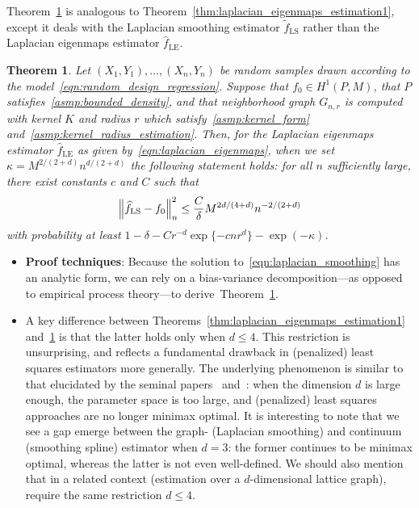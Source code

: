 \documentclass{article}
\newcommand{\1}{\mathbf{1}}
\newcommand{\wt}[1]{\widetilde{#1}}
\newcommand{\wh}[1]{\widehat{#1}}
\newcommand{\LE}{\mathrm{LE}}
\newcommand{\LS}{\mathrm{LS}}
\theoremstyle{alden}
\theoremstyle{aldenthm}
\newtheorem{theorem}{Theorem}
\theoremstyle{definition}
\theoremstyle{remark}
\begin{document}
Theorem~\ref{thm:laplacian_smoothing_estimation1} is analogous to Theorem~\ref{thm:laplacian_eigenmaps_estimation1}, except it deals with the Laplacian smoothing estimator $\wt{f}_{\LS}$ rather than the Laplacian eigenmaps estimator $\wh{f}_{\LE}$.   
\begin{theorem}
	\label{thm:laplacian_smoothing_estimation1}
	Let $(X_1,Y_1),\ldots,(X_n,Y_n)$ be random samples drawn according to the model~\eqref{eqn:random_design_regression}. Suppose that $f_0 \in H^1(P,M)$, that $P$ satisfies~\ref{asmp:bounded_density}, and that neighborhood graph $G_{n,r}$ is computed with kernel $K$ and radius $r$ which satisfy~\ref{asmp:kernel_form} and~\ref{asmp:kernel_radius_estimation}. Then, for the Laplacian eigenmaps estimator $\wh{f}_{\LE}$ as given by~\eqref{eqn:laplacian_eigenmaps}, when we set $\kappa = M^{2/(2 + d)}n^{d/(2 + d)}$ the following statement holds: for all $n$ sufficiently large, there exist constants $c$ and $C$ such that
	\begin{equation*}
	\Bigl\|\wh{f}_{\LS} - f_0\Bigr\|_n^2 \leq \frac{C}{\delta} M^{2d/(4 + d)} n^{-2/(2 + d)}
	\end{equation*}
	with probability at least $1 - \delta -  Cr^{-d}\exp\{-cnr^d\} - \exp(-\kappa)$.
\end{theorem}

\begin{itemize}
	\item \textbf{Proof techniques}: Because the solution to~\eqref{eqn:laplacian_smoothing} has an analytic form, we can rely on a bias-variance decomposition---as opposed to empirical process theory---to derive~Theorem~\ref{thm:laplacian_smoothing_estimation1}.
	\item A key difference between Theorems~\ref{thm:laplacian_eigenmaps_estimation1} and~\ref{thm:laplacian_smoothing_estimation1} is that the latter holds only when $d \leq 4$. This restriction is unsurprising, and reflects a fundamental drawback in (penalized) least squares estimators more generally. The underlying phenomenon is similar to that elucidated by the seminal papers~\cite{birge1993} and~\cite{birge1998}: when the dimension $d$ is large enough, the parameter space is too large, and (penalized) least squares approaches are no longer minimax optimal. It is interesting to note that we see a gap emerge between the graph- (Laplacian smoothing) and continuum (smoothing spline) estimator when $d = 3$: the former continues to be minimax optimal, whereas the latter is not even well-defined. We should also mention that in a related context (estimation over a $d$-dimensional lattice graph), \cite{sadhanala2016} require the same restriction $d \leq 4$. 
\end{itemize}
\end{document}
